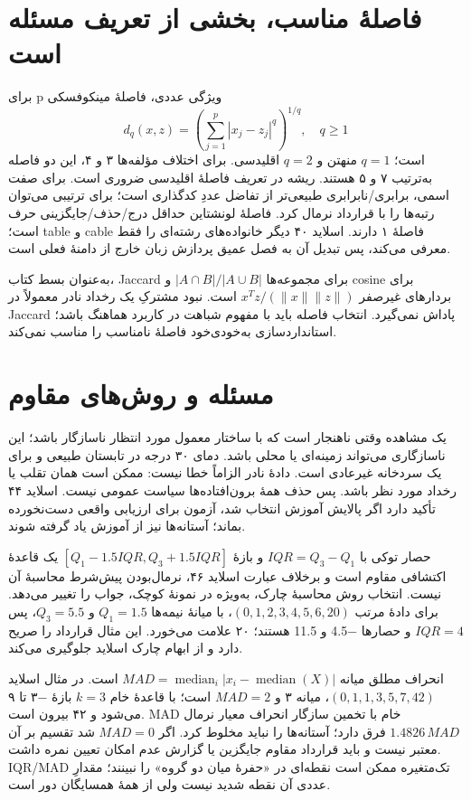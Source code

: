 \documentclass[12pt,a4paper,oneside]{report}
\begin{document}
\section{فاصلهٔ مناسب، بخشی از تعریف مسئله است}

برای p ویژگی عددی، فاصلهٔ مینکوفسکی \[
d_q(x,z)=\left(\sum_{j=1}^p|x_j-z_j|^q\right)^{1/q},\quad q\ge1
\] است؛ $q=1$ منهتن و $q=2$ اقلیدسی. برای اختلاف مؤلفه‌ها ۳ و ۴، این دو فاصله به‌ترتیب ۷ و ۵ هستند. ریشه در تعریف فاصلهٔ اقلیدسی ضروری است. برای صفت اسمی، برابری/نابرابری طبیعی‌تر از تفاضل عددِ کدگذاری است؛ برای ترتیبی می‌توان رتبه‌ها را با قرارداد نرمال کرد. فاصلهٔ لونشتاین حداقل درج/حذف/جایگزینی حرف است؛ table و cable فاصلهٔ ۱ دارند. اسلاید ۴۰ دیگر خانواده‌های رشته‌ای را فقط معرفی می‌کند، پس تبدیل آن به فصل عمیق پردازش زبان خارج از دامنهٔ فعلی است.

به‌عنوان بسط کتاب، Jaccard برای مجموعه‌ها \(|A\cap B|/|A\cup B|\) و cosine برای بردارهای غیرصفر \(x^Tz/(\|x\|\|z\|)\) است. نبود مشترکِ یک رخداد نادر معمولاً در Jaccard پاداش نمی‌گیرد. انتخاب فاصله باید با مفهوم شباهت در کاربرد هماهنگ باشد؛ استانداردسازی به‌خودی‌خود فاصلهٔ نامناسب را مناسب نمی‌کند.

\section{مسئله و روش‌های مقاوم}

یک مشاهده وقتی ناهنجار است که با ساختار معمول مورد انتظار ناسازگار باشد؛ این ناسازگاری می‌تواند زمینه‌ای یا محلی باشد. دمای ۳۰ درجه در تابستان طبیعی و برای یک سردخانه غیرعادی است. دادهٔ نادر الزاماً خطا نیست: ممکن است همان تقلب یا رخداد مورد نظر باشد. پس حذف همهٔ برون‌افتاده‌ها سیاست عمومی نیست. اسلاید ۴۴ تأکید دارد اگر پالایش آموزش انتخاب شد، آزمون برای ارزیابی واقعی دست‌نخورده بماند؛ آستانه‌ها نیز از آموزش یاد گرفته شوند.

حصار توکی با \(IQR=Q_3-Q_1\) و بازهٔ \([Q_1-1.5IQR,Q_3+1.5IQR]\) یک قاعدهٔ اکتشافی مقاوم است و برخلاف عبارت اسلاید ۴۶، نرمال‌بودن پیش‌شرط محاسبهٔ آن نیست. انتخاب روش محاسبهٔ چارک، به‌ویژه در نمونهٔ کوچک، جواب را تغییر می‌دهد. برای دادهٔ مرتب \((0,1,2,3,4,5,6,20)\)، با میانهٔ نیمه‌ها $Q_1=1.5$ و $Q_3=5.5$، پس $IQR=4$ و حصارها −4.5 و 11.5 هستند؛ ۲۰ علامت می‌خورد. این مثال قرارداد را صریح دارد و از ابهام چارک اسلاید جلوگیری می‌کند.

انحراف مطلق میانه \(MAD=\operatorname{median}_i|x_i-\operatorname{median}(X)|\) است. در مثال اسلاید \((0,1,1,3,5,7,42)\)، میانه ۳ و $MAD=2$ است؛ با قاعدهٔ خام $k=3$ بازهٔ −۳ تا ۹ می‌شود و ۴۲ بیرون است. MAD خام با تخمین سازگار انحراف معیار نرمال \(1.4826\,MAD\) فرق دارد؛ آستانه‌ها را نباید مخلوط کرد. اگر $MAD=0$ شد تقسیم بر آن معتبر نیست و باید قرارداد مقاوم جایگزین یا گزارش عدم امکان تعیین نمره داشت. IQR/MAD تک‌متغیره ممکن است نقطه‌ای در «حفرهٔ میان دو گروه» را نبینند؛ مقدارِ عددی آن نقطه شدید نیست ولی از همهٔ همسایگان دور است.
\end{document}

